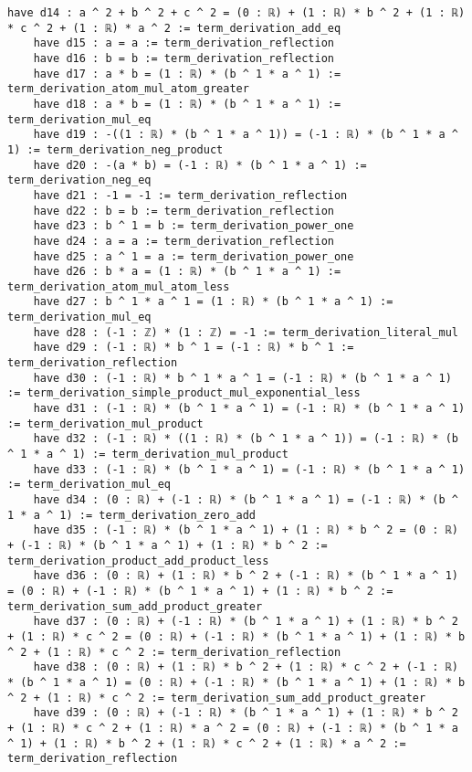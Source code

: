 \documentclass{article}
\begin{document}
\begin{tcolorbox}[colback=white!10, width=\linewidth]
\begin{lstlisting}[language=Lean4]
    have d14 : a ^ 2 + b ^ 2 + c ^ 2 = (0 : ℝ) + (1 : ℝ) * b ^ 2 + (1 : ℝ) * c ^ 2 + (1 : ℝ) * a ^ 2 := term_derivation_add_eq
    have d15 : a = a := term_derivation_reflection
    have d16 : b = b := term_derivation_reflection
    have d17 : a * b = (1 : ℝ) * (b ^ 1 * a ^ 1) := term_derivation_atom_mul_atom_greater
    have d18 : a * b = (1 : ℝ) * (b ^ 1 * a ^ 1) := term_derivation_mul_eq
    have d19 : -((1 : ℝ) * (b ^ 1 * a ^ 1)) = (-1 : ℝ) * (b ^ 1 * a ^ 1) := term_derivation_neg_product
    have d20 : -(a * b) = (-1 : ℝ) * (b ^ 1 * a ^ 1) := term_derivation_neg_eq
    have d21 : -1 = -1 := term_derivation_reflection
    have d22 : b = b := term_derivation_reflection
    have d23 : b ^ 1 = b := term_derivation_power_one
    have d24 : a = a := term_derivation_reflection
    have d25 : a ^ 1 = a := term_derivation_power_one
    have d26 : b * a = (1 : ℝ) * (b ^ 1 * a ^ 1) := term_derivation_atom_mul_atom_less
    have d27 : b ^ 1 * a ^ 1 = (1 : ℝ) * (b ^ 1 * a ^ 1) := term_derivation_mul_eq
    have d28 : (-1 : ℤ) * (1 : ℤ) = -1 := term_derivation_literal_mul
    have d29 : (-1 : ℝ) * b ^ 1 = (-1 : ℝ) * b ^ 1 := term_derivation_reflection
    have d30 : (-1 : ℝ) * b ^ 1 * a ^ 1 = (-1 : ℝ) * (b ^ 1 * a ^ 1) := term_derivation_simple_product_mul_exponential_less
    have d31 : (-1 : ℝ) * (b ^ 1 * a ^ 1) = (-1 : ℝ) * (b ^ 1 * a ^ 1) := term_derivation_mul_product
    have d32 : (-1 : ℝ) * ((1 : ℝ) * (b ^ 1 * a ^ 1)) = (-1 : ℝ) * (b ^ 1 * a ^ 1) := term_derivation_mul_product
    have d33 : (-1 : ℝ) * (b ^ 1 * a ^ 1) = (-1 : ℝ) * (b ^ 1 * a ^ 1) := term_derivation_mul_eq
    have d34 : (0 : ℝ) + (-1 : ℝ) * (b ^ 1 * a ^ 1) = (-1 : ℝ) * (b ^ 1 * a ^ 1) := term_derivation_zero_add
    have d35 : (-1 : ℝ) * (b ^ 1 * a ^ 1) + (1 : ℝ) * b ^ 2 = (0 : ℝ) + (-1 : ℝ) * (b ^ 1 * a ^ 1) + (1 : ℝ) * b ^ 2 := term_derivation_product_add_product_less
    have d36 : (0 : ℝ) + (1 : ℝ) * b ^ 2 + (-1 : ℝ) * (b ^ 1 * a ^ 1) = (0 : ℝ) + (-1 : ℝ) * (b ^ 1 * a ^ 1) + (1 : ℝ) * b ^ 2 := term_derivation_sum_add_product_greater
    have d37 : (0 : ℝ) + (-1 : ℝ) * (b ^ 1 * a ^ 1) + (1 : ℝ) * b ^ 2 + (1 : ℝ) * c ^ 2 = (0 : ℝ) + (-1 : ℝ) * (b ^ 1 * a ^ 1) + (1 : ℝ) * b ^ 2 + (1 : ℝ) * c ^ 2 := term_derivation_reflection
    have d38 : (0 : ℝ) + (1 : ℝ) * b ^ 2 + (1 : ℝ) * c ^ 2 + (-1 : ℝ) * (b ^ 1 * a ^ 1) = (0 : ℝ) + (-1 : ℝ) * (b ^ 1 * a ^ 1) + (1 : ℝ) * b ^ 2 + (1 : ℝ) * c ^ 2 := term_derivation_sum_add_product_greater
    have d39 : (0 : ℝ) + (-1 : ℝ) * (b ^ 1 * a ^ 1) + (1 : ℝ) * b ^ 2 + (1 : ℝ) * c ^ 2 + (1 : ℝ) * a ^ 2 = (0 : ℝ) + (-1 : ℝ) * (b ^ 1 * a ^ 1) + (1 : ℝ) * b ^ 2 + (1 : ℝ) * c ^ 2 + (1 : ℝ) * a ^ 2 := term_derivation_reflection

\end{lstlisting}
\end{tcolorbox}
\end{document}
